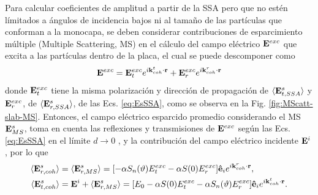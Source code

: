 Para calcular coeficientes de amplitud a partir de la SSA pero que no estén límitados a ángulos de incidencia bajos ni al tamaño de las partículas que conforman a la monocapa, se deben considerar contribuciones de esparcimiento múltiple (Multiple Scattering, MS) en el cálculo del campo eléctrico $\vb{E}^{exc}$  que excita a las partículas dentro de la placa, el cual se puede descomponer como 
	\begin{align}
	\vb{E}^{exc} = \vb{E}^{exc}_{t} e^{i\vb{k}^t_{coh}\cdot\vb{r}}+
					\vb{E}^{exc}_{r} e^{i\vb{k}^r_{coh}\cdot\vb{r}}
	\end{align}
donde  $\vb{E}^{exc}_t$ tiene la misma polarización y dirección de propagación de $\langle \vb{E}^s_{t,SSA}\rangle$  y $\vb{E}^{exc}_{r}$, de $\langle \vb{E}^s_{r,SSA}\rangle$, de las Ecs. \eqref{eq:EsSSA}, como se observa en la Fig. \ref{fig:MScatt-slab-MS}. Entonces, el campo eléctrico esparcido promedio considerando el MS $\vb{E}^s_{MS}$, toma en cuenta  las reflexiones y transmisiones de $\vb{E}^{exc}$ según las Ecs. \eqref{eq:EsSSA} en el límite $d\to 0$ \cite{gutierrez2012overview}, y la contribución del campo eléctrico incidente $\vb{E}^i$, por lo que  \cite{reyes2018analytical}
	\begin{subequations}\begin{align}
		\langle \vb{E}^s_{r,coh}\rangle & =	\langle \vb{E}^s_{r,MS}\rangle
					= \qty[-\alpha S_n(\vartheta)E^{exc}_t -\alpha S(0)E^{exc}_r
					]\vu{e}_i e^{i\vb{k}^r_{coh}\cdot\vb{r}},\\
		\langle \vb{E}^s_{t,coh}\rangle & =\vb{E}^i+\langle\vb{E}^s_{r,MS}\rangle
					= \qty[E_0 -\alpha S(0)E^{exc}_t 
					-\alpha	 S_n(\vartheta)E^{exc}_r
					]\vu{e}_i e^{i\vb{k}^t_{coh}\cdot\vb{r}}.
	\end{align} \label{eq:EsMS}\end{subequations}

